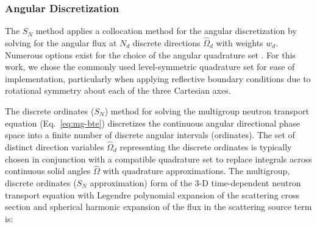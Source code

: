 \subsubsection{Angular Discretization}

The $S_N$ method applies a collocation method for the angular discretization by solving for the
angular flux at $N_d$ discrete directions $\hat{\Omega}_d$ with weights $w_d$. Numerous options
exist for the choice of the angular quadrature set .
For this work, we chose the commonly used level-symmetric quadrature set
\cite{wang_rattlesnake_2018} for ease of implementation, particularly when applying reflective
boundary conditions due to rotational symmetry about each of the three Cartesian axes.

The discrete ordinates ($S_N$) method for solving the multigroup neutron transport equation
(Eq.\ \ref{eq:mg-bte}) discretizes the continuous angular directional phase space into a finite
number of discrete angular intervals (ordinates). The set of distinct direction variables
$\hat{\Omega}_d$ representing the discrete ordinates is typically chosen in conjunction with a
compatible quadrature set to replace integrals across continuous solid angles
$\hat{\Omega}$ with quadrature approximations. The multigroup, discrete ordinates ($S_N$
approximation) form of the 3-D time-dependent neutron transport equation with Legendre polynomial
expansion of the scattering cross section and spherical harmonic expansion of the flux in the
scattering source term is:
%
